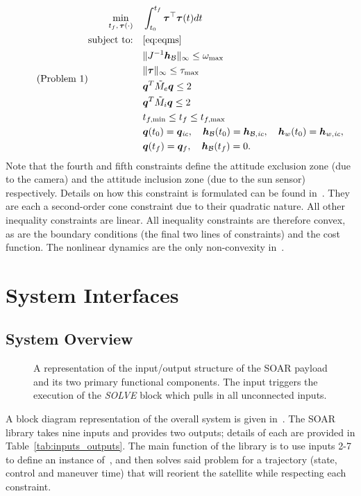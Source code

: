 \documentclass[10pt]{article}
\begin{document}
\begin{equation}\tag{Problem 1}\label{prob:prob1}
\begin{alignedat}{1}
\min_{t_f,\,\bm{\tau}(\cdot)} &\quad \int_{t_0}^{t_f} \bm{\tau}^{\top}\bm{\tau}(t) dt \\
\text{subject to:} &\quad \eqref{eq:eqms} \\
&\quad \| J^{-1}\bm{h}_{\mathcal{B}} \|_{\infty} \leq \omega_{\max} \\
&\quad \| \bm{\tau} \|_{\infty} \leq \tau_{\max} \\
&\quad \bm{q}^T \tilde{M}_e \bm{q} \leq 2 \\
&\quad \bm{q}^T \tilde{M}_i \bm{q} \leq 2 \\
&\quad t_{f,\min} \leq t_f \leq t_{f,\max}\\
&\quad \bm{q}(t_0) = \bm{q}_\textit{ic},\quad \bm{h}_{\mathcal{B}}(t_0)=\bm{h}_{\mathcal{B},\textit{ic}},\quad \bm{h}_w(t_0)=\bm{h}_{w,\textit{ic}}, \\
&\quad \bm{q}(t_f) = \bm{q}_f,\quad \bm{h}_{\mathcal{B}}(t_f) = 0.
\end{alignedat}
\end{equation}
Note that the fourth and fifth constraints define the attitude exclusion zone (due to the camera) and the attitude inclusion zone (due to the sun sensor) respectively. Details on how this constraint is formulated can be found in~\cite{Lee2014}. They are each a second-order cone constraint due to their quadratic nature. All other inequality constraints are linear. All inequality constraints are therefore convex, as are the boundary conditions (the final two lines of constraints) and the cost function. The nonlinear dynamics are the only non-convexity in~.

\section{System Interfaces}\label{sec:interfaces}

\subsection{System Overview}\label{sec2:sys_overview} 

\begin{figure}[tbh]
\centering

\caption{A representation of the input/output structure of the SOAR payload and its two primary functional components. The input  triggers the execution of the \textit{SOLVE} block which pulls in all unconnected inputs.}
\label{fig:SOAR_inner}
\end{figure}

A block diagram representation of the overall system is given in~. The SOAR library takes nine inputs and provides two outputs; details of each are provided in Table~\ref{tab:inputs_outputs}. The main function of the library is to use inputs 2-7 to define an instance of~, and then solves said problem for a trajectory (state, control and maneuver time) that will reorient the satellite while respecting each constraint. 
\end{document}
